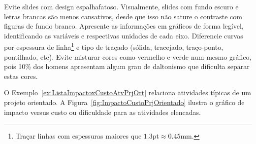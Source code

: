 Evite slides com design espalhafatoso. Visualmente, slides com fundo escuro e letras brancas são menos cansativos, desde que isso não sature o contraste com figuras de fundo branco. Apresente as informações em gráficos de forma legível, identificando as variáveis e respectivas unidades de cada eixo. Diferencie curvas por espessura de linha\footnote{Traçar linhas com espessuras maiores que  $1.3$pt$\approx 0.45$mm.} e tipo de traçado (sólida, tracejado, traço-ponto, pontilhado, etc). Evite misturar cores como vermelho e verde num mesmo gráfico, pois 10\% dos homens apresentam algum grau de daltonismo que dificulta separar estas cores. 

O Exemplo~\ref{ex:ListaImpactoxCustoAtvPrjOrt} relaciona atividades típicas de um projeto orientado. A Figura~\ref{fig:ImpactoCustoPrjOrientado} ilustra o gráfico de impacto versus custo ou dificuldade  para as atividades elencadas.

